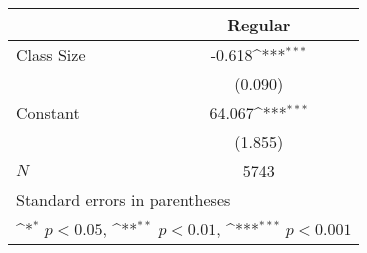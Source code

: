 {
\def\sym#1{\ifmmode^{#1}\else\(^{#1}\)\fi}
\begin{tabular}{l*{1}{c}}
\hline\hline
            &\multicolumn{1}{c}{Regular}\\
\hline
Class Size  &      -0.618\sym{***}\\
            &     (0.090)         \\
[1em]
Constant    &      64.067\sym{***}\\
            &     (1.855)         \\
\hline
\(N\)       &        5743         \\
\hline\hline
\multicolumn{2}{l}{\footnotesize Standard errors in parentheses}\\
\multicolumn{2}{l}{\footnotesize \sym{*} \(p<0.05\), \sym{**} \(p<0.01\), \sym{***} \(p<0.001\)}\\
\end{tabular}
}
